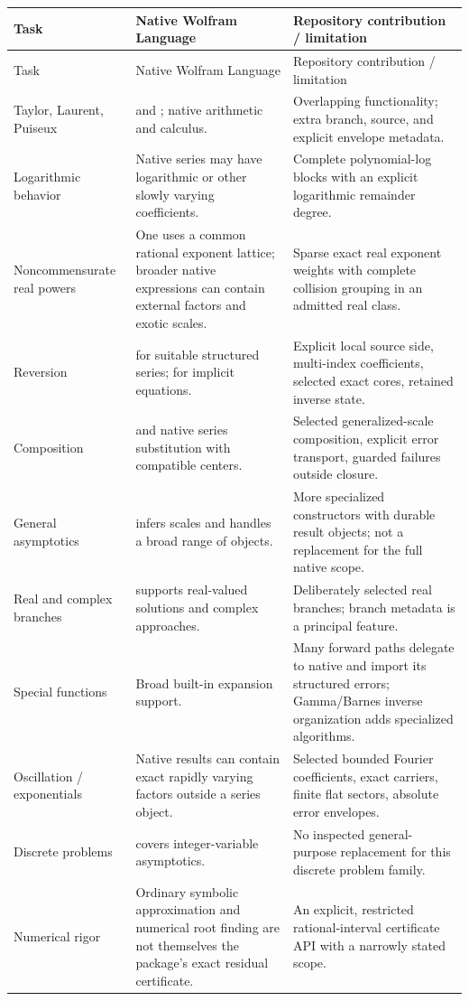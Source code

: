 \begin{longtable}{P{0.19\textwidth}P{0.35\textwidth}P{0.36\textwidth}}
\toprule Task & Native Wolfram Language & Repository contribution / limitation \\\midrule
\endfirsthead
\toprule Task & Native Wolfram Language & Repository contribution / limitation \\\midrule
\endhead
Taylor, Laurent, Puiseux &  and ; native arithmetic and calculus. & Overlapping functionality; extra branch, source, and explicit envelope metadata. \\
Logarithmic behavior & Native series may have logarithmic or other slowly varying coefficients. & Complete polynomial-log blocks with an explicit logarithmic remainder degree. \\
Noncommensurate real powers & One  uses a common rational exponent lattice; broader native expressions can contain external factors and exotic scales. & Sparse exact real exponent weights with complete collision grouping in an admitted real class. \\
Reversion &  for suitable structured series;  for implicit equations. & Explicit local source side, multi-index coefficients, selected exact cores, retained inverse state. \\
Composition &  and native series substitution with compatible centers. & Selected generalized-scale composition, explicit error transport, guarded failures outside closure. \\
General asymptotics &  infers scales and handles a broad range of objects. & More specialized constructors with durable result objects; not a replacement for the full native scope. \\
Real and complex branches &  supports real-valued solutions and complex approaches. & Deliberately selected real branches; branch metadata is a principal feature. \\
Special functions & Broad built-in expansion support. & Many forward paths delegate to native  and import its structured errors; Gamma/Barnes inverse organization adds specialized algorithms. \\
Oscillation / exponentials & Native results can contain exact rapidly varying factors outside a series object. & Selected bounded Fourier coefficients, exact carriers, finite flat sectors, absolute error envelopes. \\
Discrete problems &  covers integer-variable asymptotics. & No inspected general-purpose replacement for this discrete problem family. \\
Numerical rigor & Ordinary symbolic approximation and numerical root finding are not themselves the package's exact residual certificate. & An explicit, restricted rational-interval certificate API with a narrowly stated scope. \\
\bottomrule
\end{longtable}
